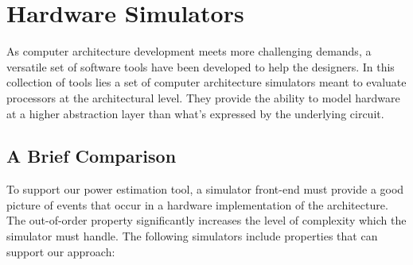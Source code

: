 \section{Hardware Simulators}

As computer architecture development meets more challenging demands, a versatile
set of software tools have been developed to help the designers. In this
collection of tools lies a set of computer architecture simulators meant to
evaluate processors at the architectural level. They provide the ability to
model hardware at a higher abstraction layer than what's expressed by the
underlying circuit.

\subsection{A Brief Comparison}
\label{subsec:simulators}
To support our power estimation tool, a simulator front-end must provide a good
picture of events that occur in a hardware implementation of the architecture.
The out-of-order property significantly increases the level of complexity which
the simulator must handle. The following simulators include properties that can
support our approach:

